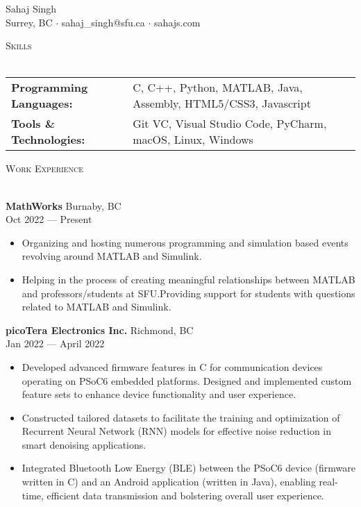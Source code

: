 \documentclass[a4paper]{article}
\newcommand{\lineunder} {
    \vspace*{-8pt} \\
    \hspace*{-18pt} \hrulefill\\
}
\newcommand{\header} [1] {
    {\hspace*{-18pt}\vspace*{6pt} \textsc{#1}}
    \vspace*{-6pt} \lineunder{}
}
\begin{document}
\vspace*{-40pt}

\vspace*{-10pt}
\begin{center}
	{\Huge {Sahaj Singh}}\\
    \vspace{1mm}
	Surrey, BC $\cdot$ sahaj\_singh@sfu.ca $\cdot$ sahajs.com\\
\end{center}

\header{Skills}
\begin{tabular}{ l l }
	\textbf{Programming Languages:} & C, C++, Python, MATLAB, Java, Assembly, HTML5/CSS3, Javascript \\
	\textbf{Tools \& Technologies:} & Git VC, Visual Studio Code, PyCharm, macOS, Linux, Windows         \\
\end{tabular}
\vspace{2mm}

\header{Work Experience}
\vspace{1mm}

\textbf{MathWorks} \hfill Burnaby, BC\\
 \hfill Oct 2022 --- Present\\
\vspace{-3mm}
\begin{itemize} \itemsep-3pt
	\item Organizing and hosting numerous programming and simulation based events revolving around MATLAB and Simulink.
	\item Helping in the process of creating meaningful relationships between MATLAB and professors/students at SFU.\@ Providing support for students with questions related to MATLAB and Simulink.
\end{itemize}
\vspace{-2mm}
\textbf{picoTera Electronics Inc.} \hfill Richmond, BC\\
 \hfill Jan 2022 --- April 2022\\
\vspace{-3mm}
\begin{itemize} \itemsep-3pt
	\item Developed advanced firmware features in C for communication devices operating on PSoC6 embedded platforms. Designed and implemented custom feature sets to enhance device functionality and user experience.
	\item Constructed tailored datasets to facilitate the training and optimization of Recurrent Neural Network (RNN) models for effective noise reduction in smart denoising applications.
	\item Integrated Bluetooth Low Energy (BLE) between the PSoC6 device (firmware written in C) and an Android application (written in Java), enabling real-time, efficient data transmission and bolstering overall user experience.
\end{itemize}
\end{document}
